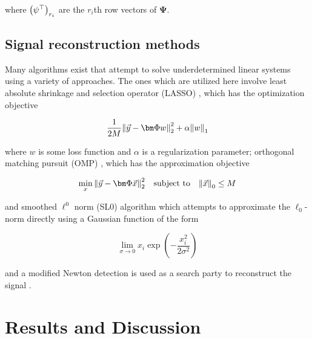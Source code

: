 \documentclass[10pt,a4paper,twoside]{article}
\begin{document}
where $\qty(\psi^\top)_{r_i}$ are the $r_i$th row vectors of $\bm\Psi$.

\subsection{Signal reconstruction methods}\label{ssec:recon}
Many algorithms exist that attempt to solve underdetermined linear systems using a variety of approaches. The ones which are utilized here involve least absolute shrinkage and selection operator (LASSO) \cite{pyrunner}, which has the optimization objective

\begin{equation}\label{eq:lasso}
	\frac{1}{2M} \norm{\vec{y} - \bm\Phi w}_2^2 + \alpha \norm{w}_1
\end{equation}

where $w$ is some loss function and $\alpha$ is a regularization parameter; orthogonal matching pursuit (OMP) \cite{sklearn}, which has the approximation objective

\begin{equation}\label{eq:omp}
	\min_x \norm{\vec{y} - \bm\Phi\vec{x}}_2^2 \quad \textrm{subject to} \quad \norm{\vec{x}}_0 \leq M
\end{equation}

and smoothed $\ell^0$ norm (SL0) algorithm \cite{sl0} which attempts to approximate the $\ell_0$-norm directly using a Gaussian function of the form

\begin{equation}\label{eq:sl0-kernel}
	\lim_{\sigma \rightarrow 0} x_i \exp(-\frac{x_i^2}{2\sigma^2})
\end{equation}

and a modified Newton detection is used as a search party to reconstruct the signal \cite{zhou}.

\section{Results and Discussion}\label{sec:RnD}
\end{document}
